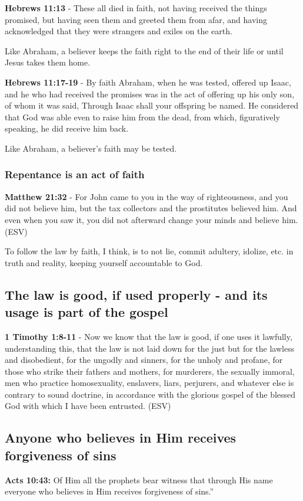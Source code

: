 \documentclass[11pt]{article}
\begin{document}
\textbf{Hebrews 11:13} - These all died in faith, not having received the things promised, but having seen them and greeted them from afar, and having acknowledged that they were strangers and exiles on the earth.

Like Abraham, a believer keeps the faith right to the end of their life or until Jesus takes them home.

\textbf{Hebrews 11:17-19} - By faith Abraham, when he was tested, offered up Isaac, and he who had received the promises was in the act of offering up his only son, of whom it was said, Through Isaac shall your offspring be named. He considered that God was able even to raise him from the dead, from which, figuratively speaking, he did receive him back.

Like Abraham, a believer's faith may be tested.

\subsubsection{Repentance is an act of faith}
\label{sec:org73bf7a5}

\textbf{Matthew 21:32} - For John came to you in the way of righteousness, and you did not believe him, but the tax collectors and the prostitutes believed him. And even when you saw it, you did not afterward change your minds and believe him. (ESV)

To follow the law by faith, I think, is to not lie, commit adultery, idolize, etc. in truth and reality, keeping yourself accountable to God.

\subsection{The law is good, if used properly - and its usage is part of the gospel}
\label{sec:org020afbb}
\textbf{1 Timothy 1:8-11} -  Now we know that the law is good, if one uses it lawfully, understanding this, that the law is not laid down for the just but for the lawless and disobedient, for the ungodly and sinners, for the unholy and profane, for those who strike their fathers and mothers, for murderers, the sexually immoral, men who practice homosexuality, enslavers, liars, perjurers, and whatever else is contrary to sound doctrine, in accordance with the glorious gospel of the blessed God with which I have been entrusted.  (ESV)

\subsection{Anyone who believes in Him receives forgiveness of sins}
\label{sec:orgfdaa7b9}
\textbf{Acts 10:43:} Of Him all the prophets bear witness that through His name everyone who believes in Him receives forgiveness of sins.”
\end{document}
